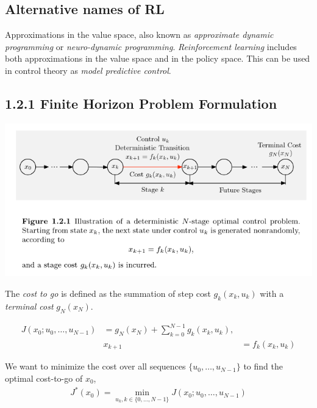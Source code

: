 \hypertarget{alternative-names-of-rl}{%
\subsection{Alternative names of RL}\label{alternative-names-of-rl}}



Approximations in the value space, also known as \emph{approximate
dynamic programming} or \emph{neuro-dynamic programming}.
\emph{Reinforcement learning} includes both approximations in the value
space and in the policy space. This can be used in control theory as
\emph{model predictive control}.

\hypertarget{finite-horizon-problem-formulation}{%
\subsection{1.2.1 Finite Horizon Problem
Formulation}\label{finite-horizon-problem-formulation}}

\includegraphics[width=\linewidth]{assets/2025-01-23-fig-1.2.1.png}

The \emph{cost to go} is defined as the summation of step cost
\(g_k(x_k, u_k)\) with a \emph{terminal cost} \(g_N(x_N)\).

\begin{align}
J(x_0; u_0, \dots, u_{N-1}) &= g_N(x_N) + \sum_{k=0}^{N-1} g_k(x_k, u_k), \\
& x_{k+1} &= f_k(x_k, u_k)
\end{align}

We want to minimize the cost over all sequences
\(\{u_0,\dots, u_{N-1}\}\) to find the optimal cost-to-go of \(x_0\),
\begin{align}
J^*(x_0) =  \min_{u_k, k \in \{0, \dots, N-1\}} J(x_0; u_0, \dots, u_{N-1})
\end{align}
